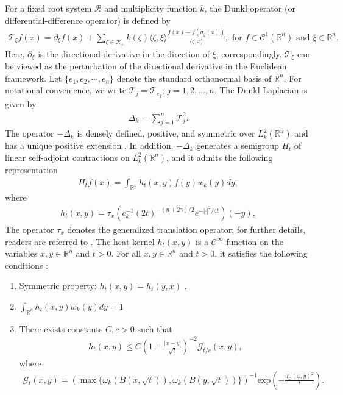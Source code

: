 \documentclass[11pt, reqno]{amsproc}
\theoremstyle{definition}
\theoremstyle{remark}
\numberwithin{equation}{section}
\begin{document}
For a fixed root system $\mathcal{R}$ and multiplicity function $k$, the Dunkl operator  (or differential-difference operator) \cite{D2} is defined by 
\begin{align*}
    \mathcal{T}_\xi f(x)= \partial_\xi f(x) + \sum_{\zeta \in \mathcal{R}_+}k(\zeta) \langle \zeta, \xi \rangle \frac{f(x)-f(\sigma_\zeta(x))}{\langle \zeta, x\rangle}, \text{ for } f \in \mathcal{C}^1(\mathbb{R}^n) \text{ and } \xi \in \mathbb{R}^n. 
\end{align*} Here, $\partial_\xi$ is the directional derivative in the direction of $\xi$; correspondingly, $\mathcal{T}_\xi$ can be viewed as the perturbation of the directional derivative in the Euclidean framework. Let $\{e_1, e_2, \cdots, e_n \}$ denote the standard orthonormal basis of \(\mathbb{R}^n\). For notational convenience, we write
$\mathcal{T}_j=\mathcal{T}_{e_j}; \, j=1,2,\dots,n.$ The Dunkl Laplacian \cite{D2}  is given by 
\begin{align*}
    \Delta_k = \sum_{j=1}^n \mathcal{T}_j^2.
\end{align*}
The operator $-\Delta_k$ is densely defined, positive, and symmetric over $L_k^2(\mathbb{R}^n)$ and has a unique positive extension \cite{Amri-2018}. In addition,  $-\Delta_k$ generates a semigroup $H_t$ of linear self-adjoint contractions on $L_k^2(\mathbb{R}^n)$, and it admits the following representation 
\begin{align*}
H_tf(x)=\int_{\mathbb{R}^n}h_t(x,y)f(y)w_k(y)dy,\end{align*}
where  
\begin{align*}
 h_t(x,y) = \tau_x \left( c_k^{-1}(2t)^{-(n+2\gamma)/2} e^{-|\cdot|^2/4t} \right)(-y), 
\end{align*}
The operator $\tau_x$ denotes the generalized translation operator; for further details, readers are referred to \cite{TV-15}. The heat kernel $h_t(x,y)$ is a $\mathcal{C}^\infty$ function on the variables $x,y\in \mathbb{R}^n$ and $t>0$. For all $x,y \in \mathbb{R}^n$ and $t>0$, it satisfies the following conditions \cite{Hejna-2019}:
\begin{enumerate} [$(i)$]
    \item Symmetric property: $h_t(x,y)=h_t(y,x)$ .\\
    \item  $ \int_{\mathbb{R}^n} h_t(x,y)w_k(y)dy = 1$ \\
    \item  There exists constants $C,c>0$ such that 
    \begin{align} \label{heat kernel esti_2}
        h_t(x,y) \leq C \left( 1+ \frac{|x-y|}{\sqrt{t}} \right)^{-2} \mathcal{G}_{t/c}(x,y),
    \end{align} where 
    \begin{align*}
        \mathcal{G}_{t}(x,y) = \left( \max \{ \omega_k(B(x,\sqrt{t})), \omega_k(B(y,\sqrt{t})) \} \right)^{-1} \text{exp} \left( -\frac{d_\mathcal{O}(x,y)^2}{t} \right).
    \end{align*}
\end{enumerate}
\end{document}
